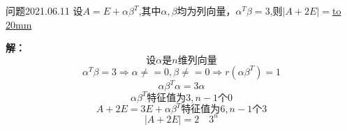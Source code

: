 \begin{mybox}{问题2021.06.11}
	\qquad 设$A=E+\alpha \beta^T$,其中$\alpha,\beta$均为列向量，$\alpha^T\beta=3$,则$\left| A+2E\right|=$\underline{\hbox to 20mm{}}
\end{mybox}	
\noindent
\textbf{解：}
$$\text{设}\alpha \text{是}n\text{维列向量}$$
$$\alpha^T \beta=3 \Rightarrow \alpha\neq=0 ,\beta \neq=0\Rightarrow r(\alpha\beta^T)=1$$
$$\alpha \beta ^T \alpha=3\alpha$$
$$\alpha \beta ^T \text{特征值为}3,n-1\text{个} 0$$
$$A+2E=3E+\alpha \beta ^T \text{特征值为}6,n-1\text{个} 3$$
$$\left| A+2E\right|=2\quad 3^n$$